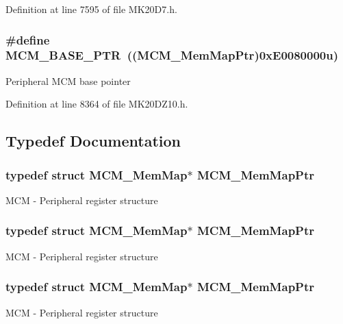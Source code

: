 Definition at line 7595 of file M\+K20\+D7.\+h.

\subsubsection[{\texorpdfstring{M\+C\+M\+\_\+\+B\+A\+S\+E\+\_\+\+P\+TR}{MCM_BASE_PTR}}]{\setlength{\rightskip}{0pt plus 5cm}\#define M\+C\+M\+\_\+\+B\+A\+S\+E\+\_\+\+P\+TR~(({\bf M\+C\+M\+\_\+\+Mem\+Map\+Ptr})0x\+E0080000u)}\hypertarget{group___m_c_m___peripheral_gad41e931f176c230831e3dbad45117841}{}\label{group___m_c_m___peripheral_gad41e931f176c230831e3dbad45117841}
Peripheral M\+CM base pointer 

Definition at line 8364 of file M\+K20\+D\+Z10.\+h.



\subsection{Typedef Documentation}
\subsubsection[{\texorpdfstring{M\+C\+M\+\_\+\+Mem\+Map\+Ptr}{MCM_MemMapPtr}}]{\setlength{\rightskip}{0pt plus 5cm}typedef struct {\bf M\+C\+M\+\_\+\+Mem\+Map}$\ast$ {\bf M\+C\+M\+\_\+\+Mem\+Map\+Ptr}}\hypertarget{group___m_c_m___peripheral_ga72e8bbe428d9410917903164d3a5f675}{}\label{group___m_c_m___peripheral_ga72e8bbe428d9410917903164d3a5f675}
M\+CM -\/ Peripheral register structure 
\subsubsection[{\texorpdfstring{M\+C\+M\+\_\+\+Mem\+Map\+Ptr}{MCM_MemMapPtr}}]{\setlength{\rightskip}{0pt plus 5cm}typedef struct {\bf M\+C\+M\+\_\+\+Mem\+Map}$\ast$ {\bf M\+C\+M\+\_\+\+Mem\+Map\+Ptr}}\hypertarget{group___m_c_m___peripheral_ga72e8bbe428d9410917903164d3a5f675}{}\label{group___m_c_m___peripheral_ga72e8bbe428d9410917903164d3a5f675}
M\+CM -\/ Peripheral register structure 
\subsubsection[{\texorpdfstring{M\+C\+M\+\_\+\+Mem\+Map\+Ptr}{MCM_MemMapPtr}}]{\setlength{\rightskip}{0pt plus 5cm}typedef struct {\bf M\+C\+M\+\_\+\+Mem\+Map}$\ast$ {\bf M\+C\+M\+\_\+\+Mem\+Map\+Ptr}}\hypertarget{group___m_c_m___peripheral_ga72e8bbe428d9410917903164d3a5f675}{}\label{group___m_c_m___peripheral_ga72e8bbe428d9410917903164d3a5f675}
M\+CM -\/ Peripheral register structure 